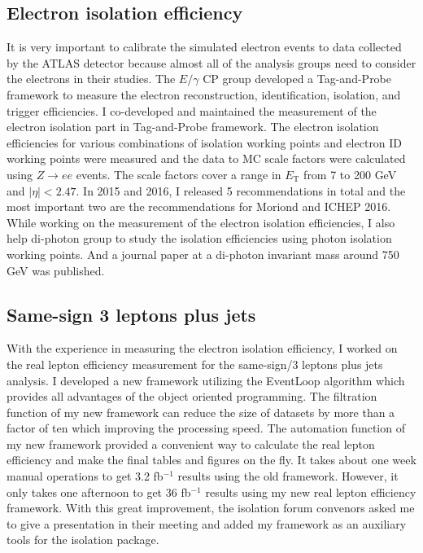\documentclass[12pt]{article}
\begin{document}
\subsection{Electron isolation efficiency}
It is very important to calibrate the simulated electron events to data collected by the ATLAS detector because almost all of the analysis groups need to consider the electrons in their studies.
The $E/\gamma$ CP group developed a Tag-and-Probe framework to measure the electron reconstruction, identification,  isolation, and trigger efficiencies.
I co-developed and maintained the measurement of the electron isolation part in Tag-and-Probe framework.
The electron isolation efficiencies for various combinations of isolation working points and electron ID working points were measured and the data to MC scale factors were calculated using $Z \to ee$ events.
The scale factors cover  a range in $E_{\textrm{T}}$ from 7 to 200 GeV and $|\eta| < 2.47$.
In 2015 and 2016, I released 5 recommendations in total and the most important two are the recommendations for Moriond and ICHEP 2016.
While working on the measurement of the electron isolation efficiencies, I also help di-photon group to study the isolation efficiencies using photon isolation working points.
And a journal paper at a di-photon invariant mass around 750 GeV was published.

\subsection{Same-sign 3 leptons plus jets}
With the experience in measuring the electron isolation efficiency, I worked on the real lepton efficiency measurement for the same-sign/3 leptons plus jets analysis.
I developed a new framework utilizing the EventLoop algorithm which provides all advantages of the object oriented programming.
The filtration function of my new framework can reduce the size of datasets by more than a factor of ten which improving the processing speed.
The automation function of my new framework provided a convenient way to calculate the real lepton efficiency and make the final tables and figures on the fly.
It takes about one week manual operations to get 3.2 fb$^{-1}$ results using the old framework.
However, it only takes one afternoon to get 36 fb$^{-1}$ results using my new real lepton efficiency framework.
With this great improvement, the isolation forum convenors asked me to give a presentation in their meeting and added my framework as an auxiliary tools for the isolation package.
\end{document}

